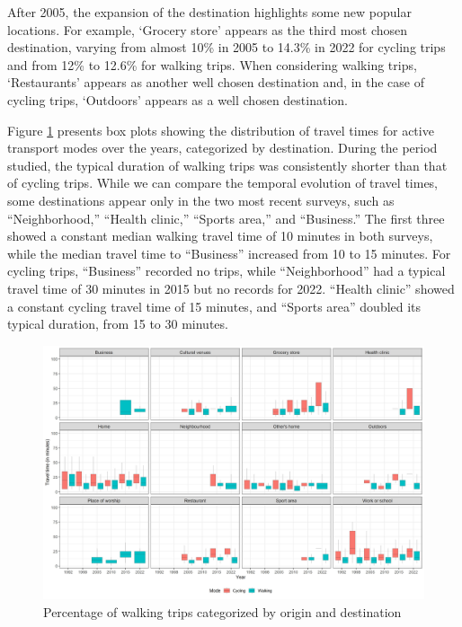 \documentclass[preprint, 3p,
authoryear]{elsarticle} %
\begin{document}
After 2005, the expansion of the destination highlights some new popular
locations. For example, `Grocery store' appears as the third most chosen
destination, varying from almost 10\% in 2005 to 14.3\% in 2022 for
cycling trips and from 12\% to 12.6\% for walking trips. When
considering walking trips, `Restaurants' appears as another well chosen
destination and, in the case of cycling trips, `Outdoors' appears as a
well chosen destination.

Figure \ref{fig:figure-boxplot} presents box plots showing the
distribution of travel times for active transport modes over the years,
categorized by destination. During the period studied, the typical
duration of walking trips was consistently shorter than that of cycling
trips. While we can compare the temporal evolution of travel times, some
destinations appear only in the two most recent surveys, such as
``Neighborhood,'' ``Health clinic,'' ``Sports area,'' and ``Business.''
The first three showed a constant median walking travel time of 10
minutes in both surveys, while the median travel time to ``Business''
increased from 10 to 15 minutes. For cycling trips, ``Business''
recorded no trips, while ``Neighborhood'' had a typical travel time of
30 minutes in 2015 but no records for 2022. ``Health clinic'' showed a
constant cycling travel time of 15 minutes, and ``Sports area'' doubled
its typical duration, from 15 to 30 minutes.

\begin{figure}
\includegraphics[width=1\linewidth]{figures/destination_boxplots} \caption{Percentage of walking trips categorized by origin and destination}\label{fig:figure-boxplot}
\end{figure}
\end{document}
